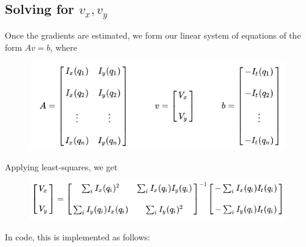 \documentclass[a4paper,11]{article}
\begin{document}
  \subsection{Solving for $v_x, v_y$}
  
  Once the gradients are estimated, we form our linear system of equations of the form $Av = b$, where
  
  \begin{figure}[H]
  \centering
  \includegraphics[scale=0.4]{avb}
  \end{figure}
  
  
  Applying least-squares, we get
  
  \begin{figure}[H]
   \centering
   \includegraphics[scale=0.4]{inverse}
  \end{figure}

  In code, this is implemented as follows:
  
\end{document}
